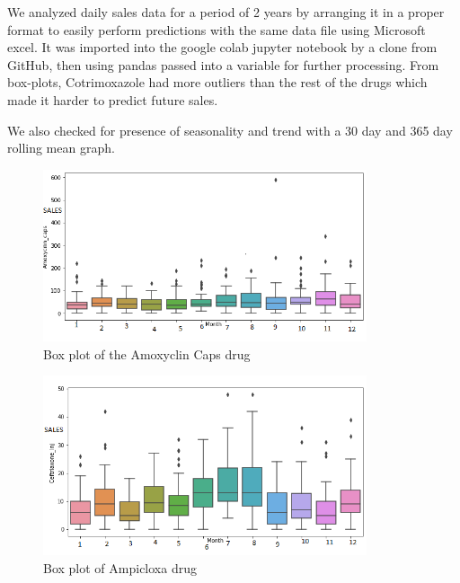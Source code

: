\documentclass[12pt]{report}
\begin{document}
We analyzed daily sales data for a period of 2 years by arranging it in a proper format to easily perform predictions with the same data file using Microsoft excel. 
It was imported into the google colab jupyter notebook by a clone from GitHub, then using pandas passed into a variable for further processing.
From box-plots, Cotrimoxazole had more outliers than the rest of the drugs which made it harder to predict future sales.
 
 We also checked for presence of seasonality and trend with a 30 day and 365 day rolling mean graph. 


\begin{figure}[H]%
  \begin {center}
  \includegraphics[width=0.85\textwidth]{images/downloadA.png}
  \caption{Box plot of the Amoxyclin Caps drug}
  \label{fig:ecg}
  \end {center}
\end{figure}

\begin{figure}[H]%
  \begin {center}
  \includegraphics[width=0.85\textwidth]{images/downloadB.png}
  \caption{Box plot of Ampicloxa drug}
  \label{fig:ecg}
  \end {center}
\end{figure}
\end{document}
